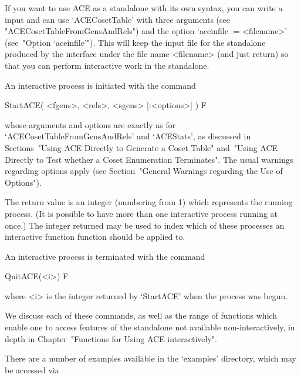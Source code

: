 
If you want to use ACE as a standalone with its own  syntax,  you  can
write a {\GAP} input and can use `ACECosetTable' with three  arguments
(see "ACECosetTableFromGensAndRels")  and  the  option  `aceinfile  :=
<filename>' (see~"Option `aceinfile'"). This will keep the input  file
for the {\ACE} standalone produced by the {\GAP} interface  under  the
file name <filename>  (and  just  return)  so  that  you  can  perform
interactive work in the standalone.


An interactive {\ACE} process is initiated with the command

\>StartACE( <fgens>, <rels>, <sgens> [:<options>] ) F

whose    arguments    and    options    are     exactly     as     for
`ACECosetTableFromGensAndRels'  and  `ACEStats',   as   discussed   in
Sections~"Using ACE Directly to Generate a Coset Table" and~"Using ACE
Directly to Test whether a Coset Enumeration  Terminates".  The  usual
warnings  regarding  options  apply  (see  Section~"General   Warnings
regarding the Use of Options").

The return value is an integer (numbering from 1) which represents the
running process. (It is possible to have  more  than  one  interactive
process running at once.) The integer returned may be  used  to  index
which of these  processes  an  interactive  function  {\ACE}  function
should be applied to.

An interactive{\ACE} process is terminated with the command

\>QuitACE(<i>) F

where <i> is the integer returned by `StartACE' when the  process  was
begun.

We discuss each of these commands, as well as the range  of  functions
which enable one to access  features  of  the  {\ACE}  standalone  not
available non-interactively, in depth in Chapter~"Functions for  Using
ACE interactively".


There are a number of examples available in the `examples'  directory,
which may be accessed via

